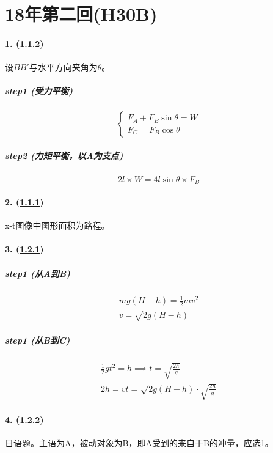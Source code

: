 
\section{18年第二回(H30B)}

\paragraph{1. (\hyperref[subsec:1.1.2]{1.1.2})} 设$BB'$与水平方向夹角为$\theta$。

\subparagraph{step1 (受力平衡)}

\begin{equation*}
    \begin{cases}
        F_A+F_B\sin\theta=W\\
        F_C=F_B\cos\theta
    \end{cases}
\end{equation*}

\subparagraph{step2 (力矩平衡，以A为支点)}

\begin{equation*}
    2l\times W=4l\sin\theta\times F_B
\end{equation*}

\paragraph{2. (\hyperref[subsec:1.1.1]{1.1.1})} x-t图像中图形面积为路程。
\paragraph{3. (\hyperref[subsec:1.2.1]{1.2.1})}

\subparagraph{step1 (从A到B)}

\begin{gather*}
    mg(H-h)=\frac12mv^2\\
    v=\sqrt{2g(H-h)}
\end{gather*}

\subparagraph{step1 (从B到C)}

\begin{gather*}
    \frac12gt^2=h\implies t=\sqrt{\frac{2h}{g}}\\
    2h=vt=\sqrt{2g(H-h)}\cdot\sqrt{\frac{2h}{g}}
\end{gather*}

\paragraph{4. (\hyperref[subsec:1.2.2]{1.2.2})} 日语题。主语为A，被动对象为B，即A受到的来自于B的冲量，应选1。
